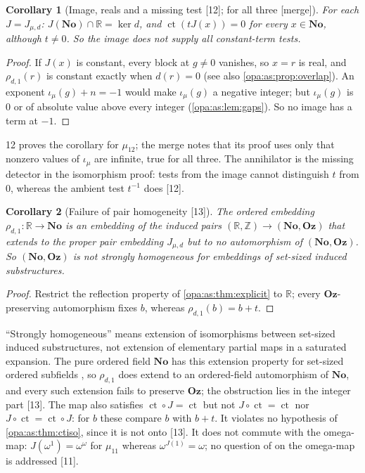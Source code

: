 \documentclass[11pt,oneside]{article}
\numberwithin{equation}{section}
\newtheorem{corollary}[corollary]{Corollary}
\theoremstyle{definition}
\theoremstyle{remark}
\newcommand{\No}{\mathbf{No}}
\newcommand{\Oz}{\mathbf{Oz}}
\newcommand{\R}{\mathbb R}
\newcommand{\Z}{\mathbb Z}
\newcommand{\ct}{\operatorname{ct}}
\newcommand{\src}[1]{\textup{\textsf{\small[#1]}}}
\newcommand{\mergetag}{\textup{\textsf{\small[merge]}}}
\begin{document}
\begin{corollary}[Image, reals and a missing test \src{12}; for all three \mergetag]\label{opa:as:cor:image}
For each $J=J_{\mu,d}$: $J(\No)\cap\R=\ker d$, and $\ct(tJ(x))=0$ for every $x\in\No$, although
$t\ne0$. So the image does not supply all constant-term tests.
\end{corollary}
\begin{proof}
If $J(x)$ is constant, every block at $g\ne0$ vanishes, so $x=r$ is real, and $\rho_{d,1}(r)$ is constant
exactly when $d(r)=0$ (see also \cref{opa:as:prop:overlap}). An exponent $\iota_\mu(g)+n=-1$ would make
$\iota_\mu(g)$ a negative integer; but $\iota_\mu(g)$ is $0$ or of absolute value above every integer
(\cref{opa:as:lem:gaps}). So no image has a term at $-1$.
\end{proof}

12 proves the corollary for $\mu_{12}$; the merge notes that its proof uses only that nonzero values of
$\iota_\mu$ are infinite, true for all three. The annihilator is the missing detector in the isomorphism
proof: tests from the image cannot distinguish $t$ from $0$, whereas the ambient test $t^{-1}$ does
\src{12}.

\begin{corollary}[Failure of pair homogeneity \src{13}]\label{opa:as:cor:homogeneity}
The ordered embedding $\rho_{d,1}:\R\to\No$ is an embedding of the induced pairs $(\R,\Z)\to(\No,\Oz)$
that extends to the proper pair embedding $J_{\mu,d}$ but to no automorphism of $(\No,\Oz)$. So
$(\No,\Oz)$ is not strongly homogeneous for embeddings of set-sized induced substructures.
\end{corollary}
\begin{proof}
Restrict the reflection property of \cref{opa:as:thm:explicit} to $\R$; every $\Oz$-preserving automorphism
fixes $b$, whereas $\rho_{d,1}(b)=b+t$.
\end{proof}

``Strongly homogeneous'' means extension of isomorphisms between set-sized induced substructures, not
extension of elementary partial maps in a saturated expansion. The pure ordered field $\No$ has this
extension property for set-sized ordered subfields \cite[Remark 2.10]{KKS}, so $\rho_{d,1}$ does extend to
an ordered-field automorphism of $\No$, and every such extension fails to preserve $\Oz$; the obstruction
lies in the integer part \src{13}. The map also satisfies $\ct\circ J=\ct$ but not $J\circ\ct=\ct$ nor
$J\circ\ct=\ct\circ J$: for $b$ these compare $b$ with $b+t$. It violates no hypothesis of
\cref{opa:as:thm:ctiso}, since it is not onto \src{13}. It does not commute with the omega-map:
$J(\omega^1)=\omega^\omega$ for $\mu_{11}$ whereas $\omega^{J(1)}=\omega$; no question of \cite{KKS} on the
omega-map is addressed \src{11}.
\end{document}
